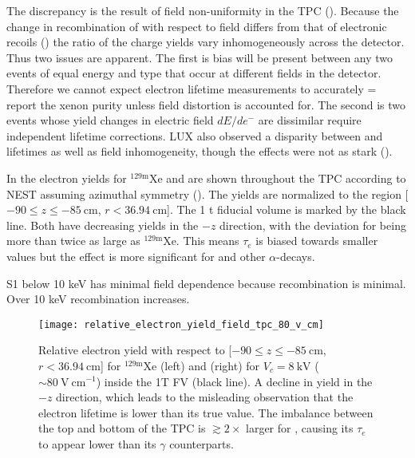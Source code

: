 The discrepancy is the result of field non-uniformity in the TPC ().  Because the change in recombination
of \alphadecays with respect to field differs from that of electronic recoils () the ratio
of the charge yields vary
inhomogeneously across the detector.  Thus two issues are apparent.  The first is bias will be present between any two events of equal
energy and type that occur at different fields in the detector.  Therefore we cannot expect electron lifetime measurements to accurately =
report the xenon purity unless field distortion is accounted for.  The second is two events whose \electron yield changes in electric field
$dE/de^-$ are dissimilar require independent lifetime corrections.  LUX also observed a disparity between \metakr and 
lifetimes as well as field inhomogeneity, though the effects were not as stark ().

In  the electron yields for $\mathrm{^{129m}Xe}$ and 
are shown throughout the TPC according to NEST assuming azimuthal symmetry ().  The yields are normalized to the
region [$-90 \leq z \leq -85\ \mathrm{cm}$,
$r < 36.94\ \mathrm{cm}$].  The 1 t fiducial volume is marked by the black line.  Both have decreasing yields in the $-z$ direction,
with the deviation for  being more than twice as large as $\mathrm{^{129m}Xe}$.  This means $\tau_e$ is biased towards
smaller values but the effect is more significant for  and other $\alpha$-decays.

S1 below 10 keV has minimal field dependence because recombination is minimal.  Over 10 keV recombination increases.

\begin{figure}
\centering
\texttt{[image: relative\_electron\_yield\_field\_tpc\_80\_v\_cm]}
\caption{Relative electron yield with respect to [$-90 \leq z \leq -85\ \mathrm{cm}$, $r < 36.94\ \mathrm{cm}$] for
$\mathrm{^{129m}Xe}$ (left) and  (right) for $V_c = 8\ \mathrm{kV}$ (${\sim}80\ \mathrm{V\ cm^{-1}}$) inside the 1T FV (black
line).  A decline in yield in the $-z$ direction, which leads to the misleading observation that the electron lifetime is lower than its
true value.  The imbalance between the top
and bottom of the TPC is $\gtrsim 2\times$ larger for , causing its $\tau_e$ to appear lower than its $\gamma$ counterparts.}
\label{fig:electron_lifetimes_rn222_vs_kr83m_field_tpc}
\end{figure}


